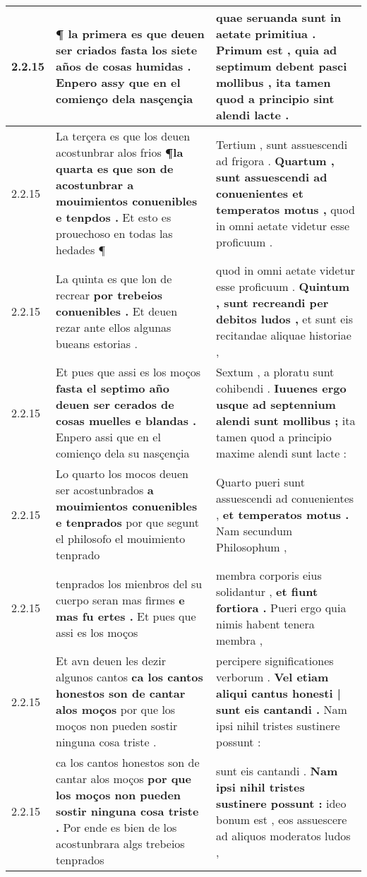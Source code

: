\begin{tabular}{|p{1cm}|p{6.5cm}|p{6.5cm}|}
2.2.15 & ¶ la primera es que deuen ser criados \textbf{ fasta los siete años de cosas humidas . } Enpero assy que en el comienço dela nasçençia & quae seruanda sunt in aetate primitiua . \textbf{ Primum est , quia ad septimum debent pasci mollibus , } ita tamen quod a principio sint alendi lacte . \\\hline
2.2.15 & La terçera es que los deuen acostunbrar alos frios \textbf{ ¶la quarta es que son de acostunbrar a mouimientos conuenibles e tenpdos . } Et esto es prouechoso en todas las hedades ¶ & Tertium , sunt assuescendi ad frigora . \textbf{ Quartum , sunt assuescendi ad conuenientes et temperatos motus , } quod in omni aetate videtur esse proficuum . \\\hline
2.2.15 & La quinta es que lon de recrear \textbf{ por trebeios conuenibles . } Et deuen rezar ante ellos algunas bueans estorias . & quod in omni aetate videtur esse proficuum . \textbf{ Quintum , sunt recreandi per debitos ludos , } et sunt eis recitandae aliquae historiae , \\\hline
2.2.15 & Et pues que assi es los moços \textbf{ fasta el septimo año deuen ser cerados de cosas muelles e blandas . } Enpero assi que en el comienço dela su nasçençia & Sextum , a ploratu sunt cohibendi . \textbf{ Iuuenes ergo usque ad septennium alendi sunt mollibus ; } ita tamen quod a principio maxime alendi sunt lacte : \\\hline
2.2.15 & Lo quarto los mocos deuen ser acostunbrados \textbf{ a mouimientos conuenibles e tenprados } por que segunt el philosofo el mouimiento tenprado & Quarto pueri sunt assuescendi ad conuenientes , \textbf{ et temperatos motus . } Nam secundum Philosophum , \\\hline
2.2.15 & tenprados los mienbros del su cuerpo seran mas firmes \textbf{ e mas fu ertes . } Et pues que assi es los moços & membra corporis eius solidantur , \textbf{ et fiunt fortiora . } Pueri ergo quia nimis habent tenera membra , \\\hline
2.2.15 & Et avn deuen les dezir algunos cantos \textbf{ ca los cantos honestos son de cantar alos moços } por que los moços non pueden sostir ninguna cosa triste . & percipere significationes verborum . \textbf{ Vel etiam aliqui cantus honesti | sunt eis cantandi . } Nam ipsi nihil tristes sustinere possunt : \\\hline
2.2.15 & ca los cantos honestos son de cantar alos moços \textbf{ por que los moços non pueden sostir ninguna cosa triste . } Por ende es bien de los acostunbrara algs trebeios tenprados & sunt eis cantandi . \textbf{ Nam ipsi nihil tristes sustinere possunt : } ideo bonum est , eos assuescere ad aliquos moderatos ludos , \\\hline

\end{tabular}
